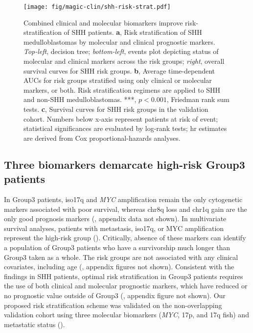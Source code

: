 \clearpage

\begin{figure}[h]
	\begin{center}
		\texttt{[image: fig/magic-clin/shh-risk-strat.pdf]}
	\end{center}
	\caption[Combined clinical and molecular biomarkers improve risk-stratification of SHH patients]
	{
	Combined clinical and molecular biomarkers improve risk-stratification of SHH patients.
	\textbf{a}, Risk stratification of SHH medulloblastomas by molecular and clinical prognostic markers. \emph{Top-left}, decision tree; \emph{bottom-left}, events plot depicting status of molecular and clinical markers across the risk groups; \emph{right}, overall survival curves for SHH risk groups.
	\textbf{b}, Average time-dependent AUCs for risk groups stratified using only clinical or molecular markers, or both. Risk stratification regimens are applied to SHH and non-SHH medulloblastomas. ***, $p < 0.001$, Friedman rank sum tests.
	\textbf{c}, Survival curves for SHH risk groups in the validation cohort.
	Numbers below x-axis represent patients at risk of event; statistical significances are evaluated by log-rank tests; \gls{hr} estimates are derived from Cox proportional-hazards analyses.
	}
	\label{fig:shh-risk-strat}
\end{figure}

\clearpage

\subsection{Three biomarkers demarcate high-risk Group3 patients}

In Group3 patients, iso17q and \emph{MYC} amplification remain the only cytogenetic markers associated with poor survival, whereas chr8q loss and chr1q gain are the only good prognosis markers (, appendix data not shown). In multivariate survival analyses, patients with metastasis, iso17q, or MYC amplification represent the high-risk group (). Critically, absence of these markers can identify a population of Group3 patients who have a survivorship much longer than Group3 taken as a whole. The risk groups are not associated with any clinical covariates, including age (, appendix figures not shown). Consistent with the findings in SHH patients, optimal risk stratification in Group3 patients requires the use of both clinical and molecular prognostic markers, which have reduced or no prognostic value outside of Group3 (, appendix figure not shown). Our proposed risk stratification scheme was validated on the non-overlapping validation cohort using three molecular biomarkers (\emph{MYC}, 17p, and 17q \gls{fish}) and metastatic status ().

